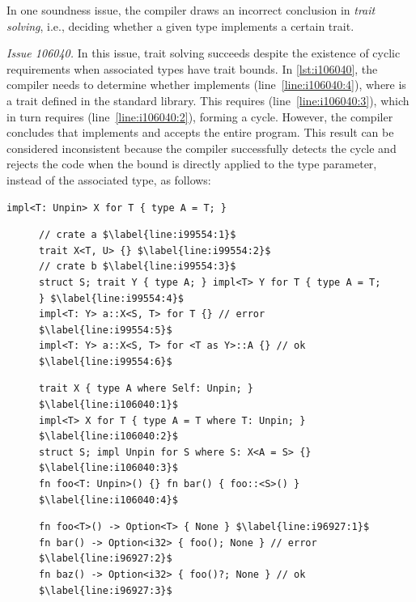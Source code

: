 In one soundness issue, the compiler draws an incorrect conclusion in
\emph{trait solving}, i.e., deciding whether a given type implements a certain
trait.

{\it Issue 106040.}
%
In this issue, trait solving succeeds despite the existence of cyclic
requirements when associated types have trait bounds.
%
In \cref{lst:i106040}, the compiler needs to determine whether  implements
 (line~\ref{line:i106040:4}), where  is a trait defined in the
standard library.
%
This requires  (line~\ref{line:i106040:3}), which in turn
requires  (line~\ref{line:i106040:2}), forming a cycle.
%
However, the compiler concludes that  implements  and accepts the
entire program.
%
This result can be considered inconsistent because the compiler successfully
detects the cycle and rejects the code when the bound is directly applied to the
type parameter, instead of the associated type, as follows:

\vspace{-0.5em}
\begin{lstlisting}[firstnumber=2]
impl<T: Unpin> X for T { type A = T; }
\end{lstlisting}
\vspace{-0.5em}

\begin{figure}[t]
\begin{lstlisting}[caption={Issue 99554}, label={lst:i99554}]
// crate a $\label{line:i99554:1}$
trait X<T, U> {} $\label{line:i99554:2}$
// crate b $\label{line:i99554:3}$
struct S; trait Y { type A; } impl<T> Y for T { type A = T; } $\label{line:i99554:4}$
impl<T: Y> a::X<S, T> for T {} // error $\label{line:i99554:5}$
impl<T: Y> a::X<S, T> for <T as Y>::A {} // ok $\label{line:i99554:6}$
\end{lstlisting}
\vspace{-1.2em}
\begin{lstlisting}[caption={Issue 106040}, label={lst:i106040}]
trait X { type A where Self: Unpin; } $\label{line:i106040:1}$
impl<T> X for T { type A = T where T: Unpin; } $\label{line:i106040:2}$
struct S; impl Unpin for S where S: X<A = S> {} $\label{line:i106040:3}$
fn foo<T: Unpin>() {} fn bar() { foo::<S>() } $\label{line:i106040:4}$
\end{lstlisting}
\vspace{-1.2em}
\begin{lstlisting}[caption={Issue 96927}, label={lst:i96927}]
fn foo<T>() -> Option<T> { None } $\label{line:i96927:1}$
fn bar() -> Option<i32> { foo(); None } // error $\label{line:i96927:2}$
fn baz() -> Option<i32> { foo()?; None } // ok $\label{line:i96927:3}$
\end{lstlisting}
\vspace{-2em}
\end{figure}

